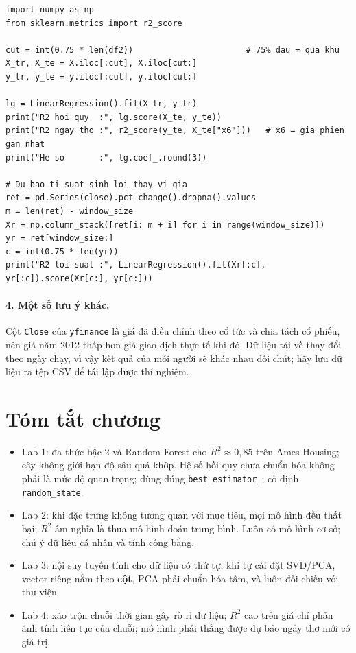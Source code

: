 \begin{lstlisting}[caption={Lab 4 -- đánh giá đúng: chia theo thời gian và so sánh với mô hình ngây thơ}]
import numpy as np
from sklearn.metrics import r2_score

cut = int(0.75 * len(df2))                       # 75% dau = qua khu
X_tr, X_te = X.iloc[:cut], X.iloc[cut:]
y_tr, y_te = y.iloc[:cut], y.iloc[cut:]

lg = LinearRegression().fit(X_tr, y_tr)
print("R2 hoi quy  :", lg.score(X_te, y_te))
print("R2 ngay tho :", r2_score(y_te, X_te["x6"]))   # x6 = gia phien gan nhat
print("He so       :", lg.coef_.round(3))

# Du bao ti suat sinh loi thay vi gia
ret = pd.Series(close).pct_change().dropna().values
m = len(ret) - window_size
Xr = np.column_stack([ret[i: m + i] for i in range(window_size)])
yr = ret[window_size:]
c = int(0.75 * len(yr))
print("R2 loi suat :", LinearRegression().fit(Xr[:c], yr[:c]).score(Xr[c:], yr[c:]))
\end{lstlisting}

\paragraph{4. Một số lưu ý khác.} Cột \texttt{Close} của \texttt{yfinance} là giá đã điều chỉnh theo cổ tức và chia tách cổ phiếu, nên giá năm 2012 thấp hơn giá giao dịch thực tế khi đó. Dữ liệu tải về thay đổi theo ngày chạy, vì vậy kết quả của mỗi người sẽ khác nhau đôi chút; hãy lưu dữ liệu ra tệp CSV để tái lập được thí nghiệm.

\section{Tóm tắt chương}
\begin{itemize}
    \item Lab 1: đa thức bậc 2 và Random Forest cho $R^2 \approx 0{,}85$ trên Ames Housing; cây không giới hạn độ sâu quá khớp. Hệ số hồi quy chưa chuẩn hóa không phải là mức độ quan trọng; dùng đúng \texttt{best\_estimator\_}; cố định \texttt{random\_state}.
    \item Lab 2: khi đặc trưng không tương quan với mục tiêu, mọi mô hình đều thất bại; $R^2$ âm nghĩa là thua mô hình đoán trung bình. Luôn có mô hình cơ sở; chú ý dữ liệu cá nhân và tính công bằng.
    \item Lab 3: nội suy tuyến tính cho dữ liệu có thứ tự; khi tự cài đặt SVD/PCA, vector riêng nằm theo \textbf{cột}, PCA phải chuẩn hóa tâm, và luôn đối chiếu với thư viện.
    \item Lab 4: xáo trộn chuỗi thời gian gây rò rỉ dữ liệu; $R^2$ cao trên giá chỉ phản ánh tính liên tục của chuỗi; mô hình phải thắng được dự báo ngây thơ mới có giá trị.
\end{itemize}

